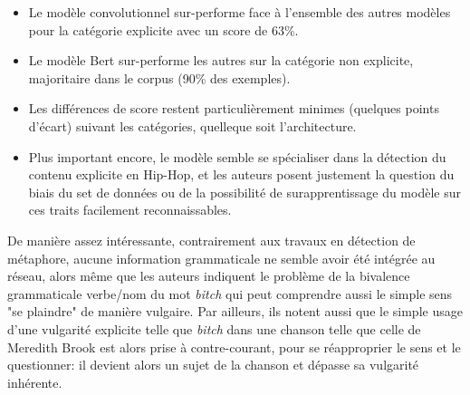 \begin{itemize}
    \item Le modèle convolutionnel sur-performe face à l'ensemble des autres modèles pour la catégorie explicite avec un score de 63\%.
    \item Le modèle Bert sur-performe les autres sur la catégorie non explicite, majoritaire dans le corpus (90\% des exemples).
    \item Les différences de score restent particulièrement minimes (quelques points d'écart) suivant les catégories, quelleque soit l'architecture.
    \item Plus important encore, le modèle semble se spécialiser dans la détection du contenu explicite en Hip-Hop, et les auteurs posent justement la question du biais du set de données ou de la possibilité de surapprentissage du modèle sur ces traits facilement reconnaissables.
\end{itemize}
De manière assez intéressante, contrairement aux travaux en détection de métaphore, aucune information grammaticale ne semble avoir été intégrée au réseau, alors même que les auteurs indiquent le problème de la bivalence grammaticale verbe/nom du mot \textit{bitch} qui peut comprendre aussi le simple sens "se plaindre" de manière vulgaire. Par ailleurs, ils notent aussi que le simple usage d'une vulgarité explicite telle que \textit{bitch} dans une chanson telle que celle de Meredith Brook est alors prise à contre-courant, pour se réapproprier le sens et le questionner: il devient alors un sujet de la chanson et dépasse sa vulgarité inhérente.

